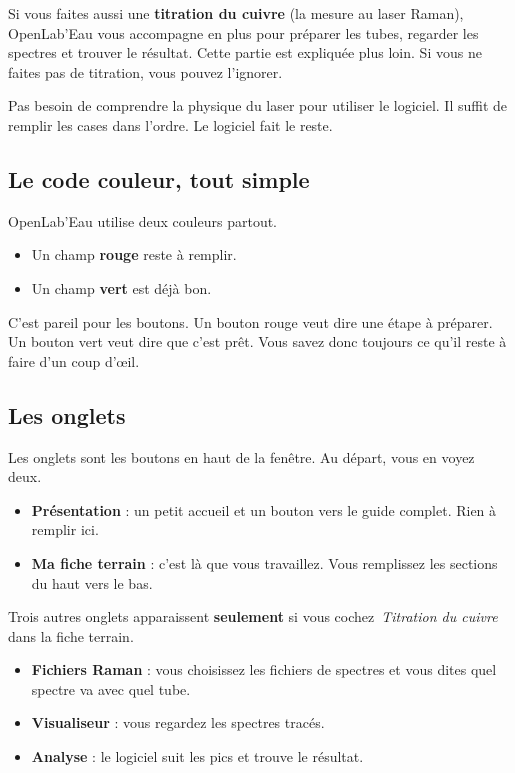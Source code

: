 \documentclass[12pt, a4paper]{article}
\newcommand{\rouge}[1]{\textbf{\textcolor{redfield}{#1}}}
\newcommand{\vertok}[1]{\textbf{\textcolor{greenok}{#1}}}
\newcommand{\onglet}[1]{\textbf{\color{mainblue}#1}}
\newcommand{\champ}[1]{\textit{\color{accentteal}\og\,#1\,\fg{}}}
\begin{document}
Si vous faites aussi une \textbf{titration du cuivre} (la mesure au laser
Raman), OpenLab'Eau vous accompagne en plus pour préparer les tubes,
regarder les spectres et trouver le résultat. Cette partie est expliquée
plus loin. Si vous ne faites pas de titration, vous pouvez l'ignorer.

\begin{conseil}
  Pas besoin de comprendre la physique du laser pour utiliser le logiciel.
  Il suffit de remplir les cases dans l'ordre. Le logiciel fait le reste.
\end{conseil}

\subsection{Le code couleur, tout simple}

OpenLab'Eau utilise deux couleurs partout.

\begin{itemize}
  \item Un champ \rouge{rouge} reste à remplir.
  \item Un champ \vertok{vert} est déjà bon.
\end{itemize}

C'est pareil pour les boutons. Un bouton rouge veut dire une étape à
préparer. Un bouton vert veut dire que c'est prêt. Vous savez donc
toujours ce qu'il reste à faire d'un coup d'œil.

\subsection{Les onglets}

Les onglets sont les boutons en haut de la fenêtre. Au départ, vous en
voyez deux.

\begin{itemize}
  \item \onglet{Présentation} : un petit accueil et un bouton vers le
        guide complet. Rien à remplir ici.
  \item \onglet{Ma fiche terrain} : c'est là que vous travaillez. Vous
        remplissez les sections du haut vers le bas.
\end{itemize}

Trois autres onglets apparaissent \textbf{seulement} si vous cochez
\champ{Titration du cuivre} dans la fiche terrain.

\begin{itemize}
  \item \onglet{Fichiers Raman} : vous choisissez les fichiers de spectres
        et vous dites quel spectre va avec quel tube.
  \item \onglet{Visualiseur} : vous regardez les spectres tracés.
  \item \onglet{Analyse} : le logiciel suit les pics et trouve le
        résultat.
\end{itemize}
\end{document}
